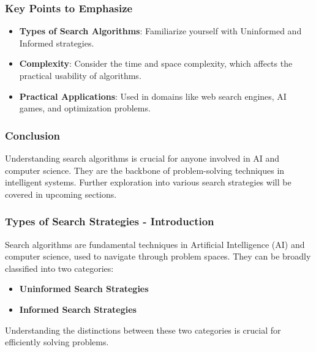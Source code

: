 \documentclass[aspectratio=169]{beamer}
\begin{document}
\begin{frame}[fragile]
    \frametitle{Key Points to Emphasize}
    \begin{itemize}
        \item \textbf{Types of Search Algorithms}: Familiarize yourself with Uninformed and Informed strategies.
        \item \textbf{Complexity}: Consider the time and space complexity, which affects the practical usability of algorithms.
        \item \textbf{Practical Applications}: Used in domains like web search engines, AI games, and optimization problems.
    \end{itemize}
\end{frame}

\begin{frame}[fragile]
    \frametitle{Conclusion}
    Understanding search algorithms is crucial for anyone involved in AI and computer science. They are the backbone of problem-solving techniques in intelligent systems. Further exploration into various search strategies will be covered in upcoming sections.
\end{frame}

\begin{frame}[fragile]
    \frametitle{Types of Search Strategies - Introduction}
    Search algorithms are fundamental techniques in Artificial Intelligence (AI) and computer science, used to navigate through problem spaces. 
    They can be broadly classified into two categories:
    \begin{itemize}
        \item \textbf{Uninformed Search Strategies}
        \item \textbf{Informed Search Strategies}
    \end{itemize}
    Understanding the distinctions between these two categories is crucial for efficiently solving problems.
\end{frame}
\end{document}
